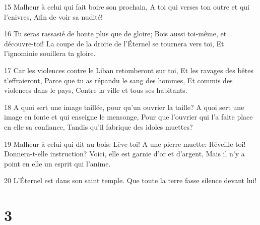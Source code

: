 \par 15 Malheur à celui qui fait boire son prochain, A toi qui verses ton outre et qui l'enivres, Afin de voir sa nudité!
\par 16 Tu seras rassasié de honte plus que de gloire; Bois aussi toi-même, et découvre-toi! La coupe de la droite de l'Éternel se tournera vers toi, Et l'ignominie souillera ta gloire.
\par 17 Car les violences contre le Liban retomberont sur toi, Et les ravages des bêtes t'effraieront, Parce que tu as répandu le sang des hommes, Et commis des violences dans le pays, Contre la ville et tous ses habitants.
\par 18 A quoi sert une image taillée, pour qu'un ouvrier la taille? A quoi sert une image en fonte et qui enseigne le mensonge, Pour que l'ouvrier qui l'a faite place en elle sa confiance, Tandis qu'il fabrique des idoles muettes?
\par 19 Malheur à celui qui dit au bois: Lève-toi! A une pierre muette: Réveille-toi! Donnera-t-elle instruction? Voici, elle est garnie d'or et d'argent, Mais il n'y a point en elle un esprit qui l'anime.
\par 20 L'Éternel est dans son saint temple. Que toute la terre fasse silence devant lui!

\chapter{3}

